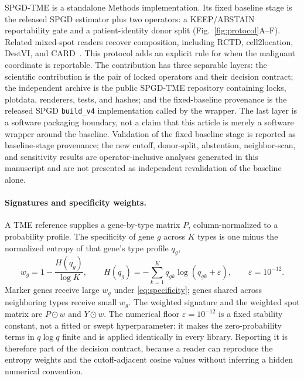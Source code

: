 SPGD-TME is a standalone Methods implementation. Its fixed baseline stage is the released SPGD estimator \citep{Fu2026spgd} plus two operators: a KEEP/ABSTAIN reportability gate and a patient-identity donor split (Fig.~\ref{fig:protocol}A--F). Related mixed-spot readers recover composition, including RCTD, cell2location, DestVI, and CARD~\citep{Cable2022,Kleshchevnikov2022,Lopez2022,Ma2022}. This protocol adds an explicit rule for when the malignant coordinate is reportable. The contribution has three separable layers: the scientific contribution is the pair of locked operators and their decision contract; the independent archive is the public SPGD-TME repository containing locks, plotdata, renderers, tests, and hashes; and the fixed-baseline provenance is the released SPGD \texttt{build\_v4} implementation called by the wrapper. The last layer is a software packaging boundary, not a claim that this article is merely a software wrapper around the baseline. Validation of the fixed baseline stage is reported as baseline-stage provenance; the new cutoff, donor-split, abstention, neighbor-scan, and sensitivity results are operator-inclusive analyses generated in this manuscript and are not presented as independent revalidation of the baseline alone.

\paragraph{Signatures and specificity weights.}
A TME reference supplies a gene-by-type matrix \(P\), column-normalized to a probability profile. The specificity of gene \(g\) across \(K\) types is one minus the normalized entropy of that gene's type profile \(q_g\),
\begin{equation}
w_g=1-\frac{H(q_g)}{\log K},\qquad H(q_g)=-\sum_{k=1}^{K} q_{gk}\log(q_{gk}+\varepsilon),\qquad \varepsilon=10^{-12}.
\label{eq:specificity}
\end{equation}
Marker genes receive large \(w_g\) under \eqref{eq:specificity}; genes shared across neighboring types receive small \(w_g\). The weighted signature and the weighted spot matrix are \(P\odot w\) and \(Y\odot w\). The numerical floor \(\varepsilon=10^{-12}\) is a fixed stability constant, not a fitted or swept hyperparameter: it makes the zero-probability terms in \(q\log q\) finite and is applied identically in every library. Reporting it is therefore part of the decision contract, because a reader can reproduce the entropy weights and the cutoff-adjacent cosine values without inferring a hidden numerical convention.

